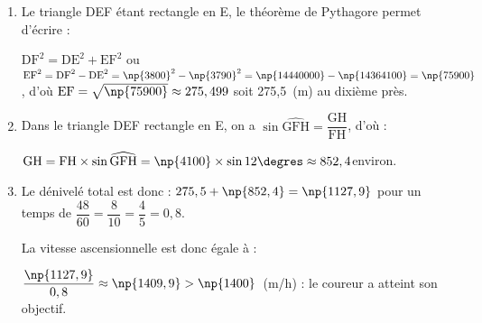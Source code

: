 \bigskip

\begin{enumerate}
\item %
Le triangle DEF étant rectangle en E, le théorème de Pythagore permet d'écrire :

$\text{DF}^2 = \text{DE}^2 + \text{EF}^2$ ou $\text{EF}^2 = \text{DF}^2 - \text{DE}^2 = \np{3800}^2 - \np{3790}^2 = \np{14440000} - \np{14364100} = \np{75900}$, d'où $\text{EF} = \sqrt{\np{75900}} \approx 275,499$ soit 275,5~(m) au dixième près.
\item %
Dans le triangle DEF  rectangle en E, on a $\sin \widehat{\text{GFH}} = \dfrac{\text{GH}}{\text{FH}}$, d'où :

$\text{GH} = \text{FH} \times \sin \widehat{\text{GFH}} = \np{4100}\times \sin 12\degres \approx 852,4$environ.
\item %

Le dénivelé total est donc : $275,5 + \np{852,4} = \np{1127,9}$ pour un temps de $\dfrac{48}{60} =\dfrac{8}{10} = \dfrac{4}{5} = 0,8$.

La vitesse ascensionnelle est donc égale à : 

$\dfrac{\np{1127,9}}{0,8} \approx  \np{1409,9} > \np{1400}$~(m/h) : le coureur a atteint son objectif.

\end{enumerate}
